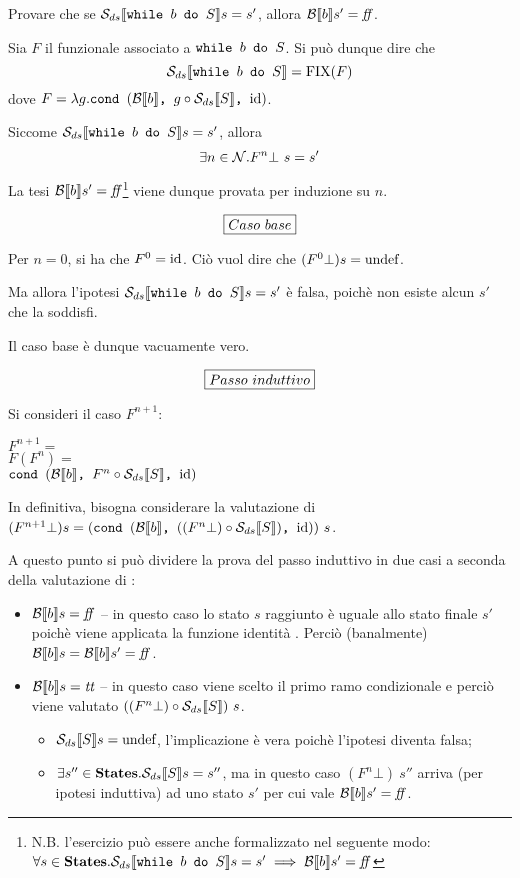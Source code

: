 {
  Provare che se $\dsCtxt{\wbS{b}{S}} s = s'$, allora $\B{b}' = \semfalse$.
}
{
}

Sia $F$ il funzionale associato a $\wbS{b}{S}$. Si può dunque dire che
$$
\dsCtxt{\wbS{b}{S}} = \fixp{F}
$$
dove $F = \lambda{g}.\cond{b}{g \circ \dsCtxt{S}}{\idDS}$.

Siccome $\dsCtxt{\wbS{b}{S}} s = s'$, allora
$$
\exists{n}\in\Ncal. F^n \bot\ s = s'
$$

La tesi $\B{b}' = \semfalse$\footnote{N.B. l'esercizio può essere anche
formalizzato nel seguente modo:
$\forall{s\in\states}.\dsCtxt{\wbS{b}{S}} s = s' \implies \B{b}' = \semfalse$} 
viene dunque provata per induzione su $n$.

$$
\boxer{Caso\ base}
$$

Per $n = 0$, si ha che $F^0 = \idDS$. Ciò vuol dire che
$(F^0 \bot) s = \undefDS$.

Ma allora l'ipotesi $\dsCtxt{\wbS{b}{S}} s = s'$ è falsa,
poichè non esiste alcun $s'$ che la soddisfi.

Il caso base è dunque vacuamente vero.

$$
\boxer{Passo\ induttivo}
$$

Si consideri il caso $F^{n+1}$:
\vspace{.5em}

\noindent $F^{n+1} =$ \\
\noindent $F(F^n) =$ \\
\noindent $\cond{b}{F^n \circ \dsCtxt{S}}{\idDS}$
\vspace{.5em}

In definitiva, bisogna considerare la valutazione di
$(F^{n+1} \bot) s = (\cond{b}{((F^n \bot) \circ \dsCtxt{S})}{\idDS})\ s$.

A questo punto si può dividere la prova del passo induttivo in due casi a
seconda della valutazione di :
\begin{itemize}
  \item $\B{b} = \semfalse$ -- in questo caso lo stato $s$ raggiunto è uguale
    allo stato finale $s'$ poichè viene applicata la funzione identità \idDS{}.
    Perciò (banalmente) $\B{b} = \B{b}' = \semfalse$.
  \item $\B{b} = \semtrue$ -- in questo caso viene scelto il primo ramo
    condizionale e perciò viene valutato
    $((F^n \bot) \circ \dsCtxt{S})\ s$.
    \begin{itemize}
      \item $\dsCtxt{S} s = \undefDS$, l'implicazione è vera poichè l'ipotesi
        diventa falsa;
      \item $\exists{s''}\in\states.\dsCtxt{S} s = s''$, ma in questo caso
        $(F^n \bot)\ s''$ arriva (per ipotesi induttiva) ad uno stato $s'$ per
        cui vale $\B{b}' = \semfalse$.
    \end{itemize}
\end{itemize}
